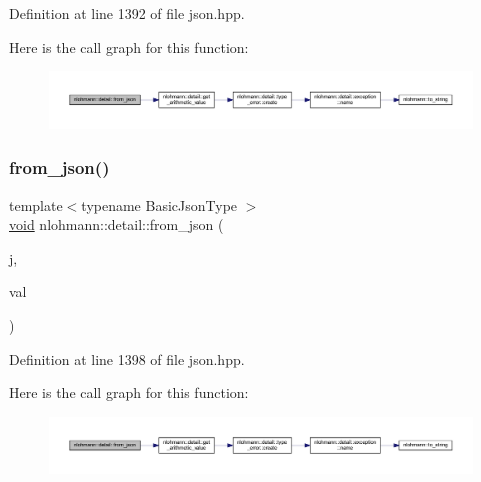 Definition at line 1392 of file json.\+hpp.

Here is the call graph for this function\+:
\nopagebreak
\begin{figure}[H]
\begin{center}
\leavevmode
\includegraphics[width=350pt]{namespacenlohmann_1_1detail_a7cb5dd7d46a60e65f9a8e0873b3f7dd8_cgraph}
\end{center}
\end{figure}
\mbox{\label{namespacenlohmann_1_1detail_ace4d5680ba413d9fd897ccb5d9c61a1c}} 
\subsubsection{\texorpdfstring{from\_json()}{from\_json()}\hspace{0.1cm}{\footnotesize\ttfamily [6/18]}}
{\footnotesize\ttfamily template$<$typename Basic\+Json\+Type $>$ \\
\mbox{\hyperlink{namespacenlohmann_1_1detail_a59fca69799f6b9e366710cb9043aa77d}{void}} nlohmann\+::detail\+::from\+\_\+json (\begin{DoxyParamCaption}\item[{const Basic\+Json\+Type \&}]{j,  }\item[{typename Basic\+Json\+Type\+::number\+\_\+unsigned\+\_\+t \&}]{val }\end{DoxyParamCaption})}



Definition at line 1398 of file json.\+hpp.

Here is the call graph for this function\+:
\nopagebreak
\begin{figure}[H]
\begin{center}
\leavevmode
\includegraphics[width=350pt]{namespacenlohmann_1_1detail_ace4d5680ba413d9fd897ccb5d9c61a1c_cgraph}
\end{center}
\end{figure}
\mbox{\label{namespacenlohmann_1_1detail_a047d881e611fcac709dc318f730a1732}} 
